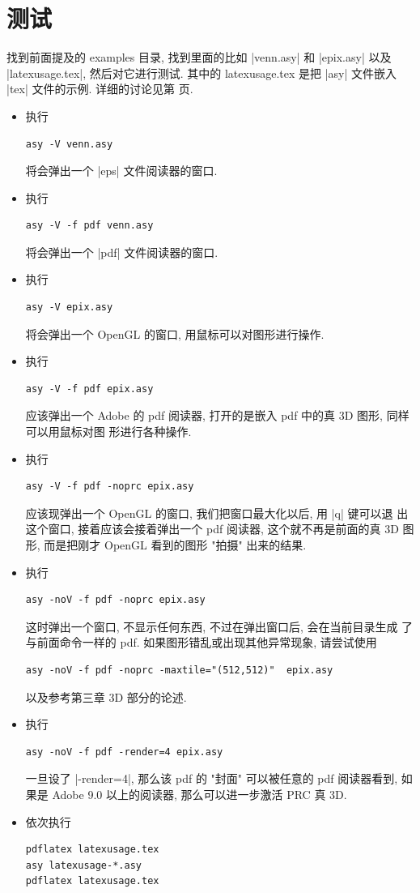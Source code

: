 \documentclass[nofonts,CJKnormalspaces]{ctexbook}[2009/05/20]
\begin{document}
\section{测试}
找到前面提及的 examples 目录, 找到里面的比如 |venn.asy| 和 |epix.asy|
以及 |latexusage.tex|, 然后对它进行测试. 其中的 latexusage.tex 是把
|asy| 文件嵌入 |tex| 文件的示例. 详细的讨论见第 \pageref{asy:latexmk}
页.
\begin{itemize}
\item 执行
\begin{verbatim}
asy -V venn.asy
\end{verbatim}
  将会弹出一个 |eps| 文件阅读器的窗口.
\item 执行
\begin{verbatim}
asy -V -f pdf venn.asy
\end{verbatim}
  将会弹出一个 |pdf| 文件阅读器的窗口.
\item 执行
\begin{verbatim}
asy -V epix.asy
\end{verbatim}
  将会弹出一个 OpenGL 的窗口, 用鼠标可以对图形进行操作.
\item 执行
\begin{verbatim}
asy -V -f pdf epix.asy
\end{verbatim}
  应该弹出一个 Adobe 的 pdf 阅读器, 打开的是嵌入 pdf 中的真 3D 图形, 同样可以用鼠标对图
  形进行各种操作.
\item 执行
\begin{verbatim}
asy -V -f pdf -noprc epix.asy
\end{verbatim}
  应该现弹出一个 OpenGL 的窗口, 我们把窗口最大化以后, 用 |q| 键可以退
  出这个窗口, 接着应该会接着弹出一个 pdf 阅读器, 这个就不再是前面的真
  3D 图形, 而是把刚才 OpenGL 看到的图形 "拍摄" 出来的结果.
\item 执行
\begin{verbatim}
asy -noV -f pdf -noprc epix.asy
\end{verbatim}
  这时弹出一个窗口, 不显示任何东西, 不过在弹出窗口后, 会在当前目录生成
  了与前面命令一样的 pdf. 如果图形错乱或出现其他异常现象, 请尝试使用
\begin{verbatim}
asy -noV -f pdf -noprc -maxtile="(512,512)"  epix.asy
\end{verbatim}
  以及参考第三章 3D 部分的论述.
\item 执行
\begin{verbatim}
asy -noV -f pdf -render=4 epix.asy
\end{verbatim}
  一旦设了 |-render=4|, 那么该 pdf 的 "封面" 可以被任意的 pdf 阅读器看到, 如果是
  Adobe 9.0 以上的阅读器, 那么可以进一步激活 PRC 真 3D.

\item 依次执行
\begin{verbatim}
pdflatex latexusage.tex
asy latexusage-*.asy
pdflatex latexusage.tex
\end{verbatim}

\end{itemize}
\end{document}
